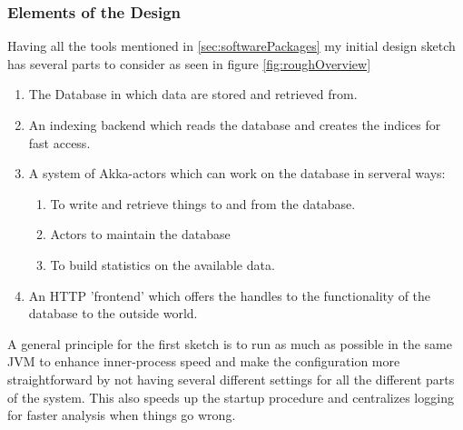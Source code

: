 \documentclass[twoside, 11pt]{scrartcl}
\begin{document}
\subsubsection{Elements of the Design}
Having all the tools mentioned in \ref{sec:softwarePackages} my initial design sketch has several parts to consider as seen in figure \ref{fig:roughOverview}
\begin{enumerate}
	\item The Database in which data are stored and retrieved from.
	\item An indexing backend which reads the database and creates the indices for fast access.
	\item A system of Akka-actors which can work on the database in serveral ways:
	\begin{enumerate}
		\item To write and retrieve things to and from the database.
		\item Actors to maintain the database
		\item To build statistics on the available data.		
	\end{enumerate}	
	\item An HTTP 'frontend' which offers the handles to the functionality of the database to the outside world.
\end{enumerate}

A general principle for the first sketch is to run as much as possible in the same JVM to enhance inner-process speed and make the configuration more straightforward by not having several different settings for all the different parts of the system. This also speeds up the startup procedure and centralizes logging for faster analysis when things go wrong. \\
\end{document}
